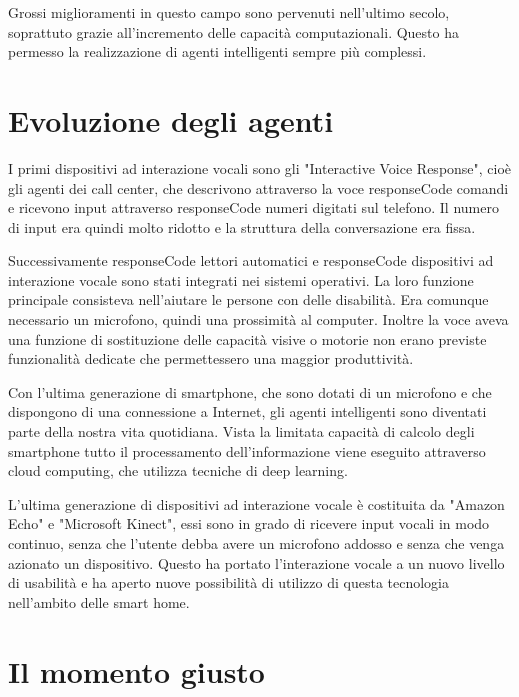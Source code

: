 \documentclass[twoside]{supsistudent}
\begin{document}
Grossi miglioramenti in questo campo sono pervenuti nell'ultimo secolo, soprattuto grazie all'incremento delle capacità computazionali. Questo ha permesso la realizzazione di agenti intelligenti sempre più complessi.

\section{Evoluzione degli agenti}

I primi dispositivi ad interazione vocali sono gli "Interactive Voice Response", cioè gli agenti dei call center, che descrivono attraverso la voce responseCode comandi e ricevono input attraverso responseCode numeri digitati sul telefono. Il numero di input era quindi molto ridotto e la struttura della conversazione era fissa.

Successivamente responseCode lettori automatici e responseCode dispositivi ad interazione vocale sono stati integrati nei sistemi operativi. La loro funzione principale consisteva nell'aiutare le persone con delle disabilità. Era comunque necessario un microfono, quindi una prossimità al computer. Inoltre la voce aveva una funzione di sostituzione delle capacità visive o motorie non erano previste funzionalità dedicate che permettessero una maggior produttività.

Con l'ultima generazione di smartphone, che sono dotati di un microfono e che dispongono di una connessione a Internet, gli agenti intelligenti sono diventati parte della nostra vita quotidiana. Vista la limitata capacità di calcolo degli smartphone tutto il processamento dell'informazione viene eseguito attraverso cloud computing, che utilizza tecniche di deep learning.

L'ultima generazione di dispositivi ad interazione vocale è costituita da "Amazon Echo" e "Microsoft Kinect", essi sono in grado di ricevere input vocali in modo continuo, senza che l'utente debba avere un microfono addosso e senza che venga azionato un dispositivo. Questo ha portato l'interazione vocale  a un nuovo livello di usabilità e ha aperto nuove possibilità di utilizzo di questa tecnologia nell'ambito delle smart home.

\section{Il momento giusto}
\end{document}
